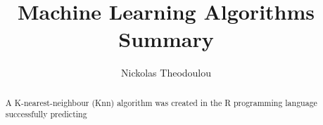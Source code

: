 \documentclass[10pt]{article}								%
\title{Machine Learning Algorithms Summary}
\author{Nickolas Theodoulou}
\begin{document}
\maketitle

\begin{abstract}

A K-nearest-neighbour (Knn) algorithm was created in the R programming language successfully predicting 



\end{abstract}


\tableofcontents

\clearpage
 


\clearpage


\clearpage

\appendix
\end{document}
